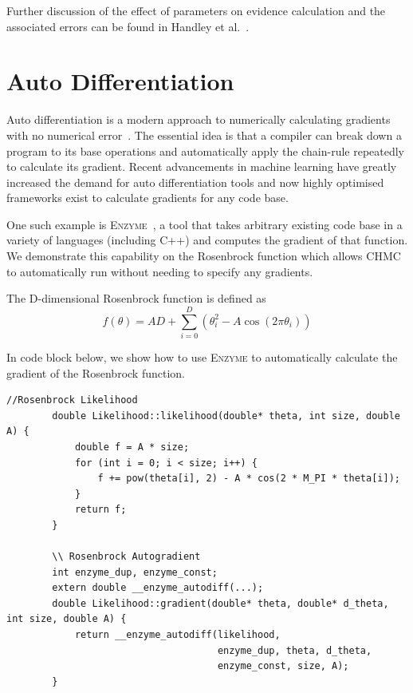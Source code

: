 \documentclass[11pt]{article}
\begin{document}
    Further discussion of the effect of parameters on evidence calculation and the associated errors can be found in
    Handley et al.~\cite{Handley_2015, NS_Review_2022}.


\section{Auto Differentiation}\label{sec:autodiff}
    Auto differentiation is a modern approach to numerically calculating gradients with no numerical
    error~\cite{carpenter2015stan}.
    The essential idea is that a compiler can break down a program to its base operations and automatically apply the
    chain-rule repeatedly to calculate its gradient.
    Recent advancements in machine learning have greatly increased the demand for auto differentiation tools and now
    highly optimised frameworks exist to calculate gradients for any code base.

    One such example is \textsc{Enzyme}~\cite{NEURIPS2020_9332c513, 10.1145/3458817.3476165, 10.5555/3571885.3571964},
    a tool that takes arbitrary existing code base in a variety of languages (including C++) and computes the
    gradient of that function.
    We demonstrate this capability on the Rosenbrock function which allows CHMC to automatically run without needing to
    specify any gradients.

    The D-dimensional Rosenbrock function is defined as
    \begin{equation}\label{eq:rosenbrock}
    f(\theta) = AD + \sum_{i=0}^D\left(\theta_i^2 - A \cos (2 \pi \theta_i) \right)
    \end{equation}

    In code block below, we show how to use \textsc{Enzyme} to automatically calculate the gradient
    of the Rosenbrock function.

    \begin{widetext}
        \begin{lstlisting}[label={lst:enzyme}]
        //Rosenbrock Likelihood
        double Likelihood::likelihood(double* theta, int size, double A) {
            double f = A * size;
            for (int i = 0; i < size; i++) {
                f += pow(theta[i], 2) - A * cos(2 * M_PI * theta[i]);
            }
            return f;
        }

        \\ Rosenbrock Autogradient
        int enzyme_dup, enzyme_const;
        extern double __enzyme_autodiff(...);
        double Likelihood::gradient(double* theta, double* d_theta, int size, double A) {
            return __enzyme_autodiff(likelihood,
                                     enzyme_dup, theta, d_theta,
                                     enzyme_const, size, A);
        }
        \end{lstlisting}
    \end{widetext}
\end{document}
